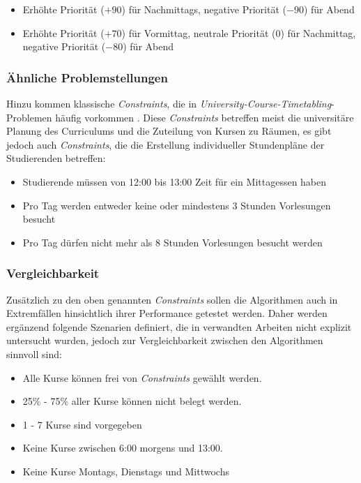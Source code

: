 \begin{itemize}
  \item Erhöhte Priorität ($+90$) für Nachmittags, negative Priorität ($-90$) für Abend
  \item Erhöhte Priorität ($+70$) für Vormittag, neutrale Priorität ($0$) für Nachmittag, negative Priorität ($-80$) für Abend
\end{itemize}





\subsubsection{Ähnliche Problemstellungen}

Hinzu kommen klassische \textit{Constraints}, die in \textit{University-Course-Timetabling}-Problemen häufig vorkommen \cite{chen-2021}. Diese \textit{Constraints} betreffen meist die universitäre Planung des Curriculums und die Zuteilung von Kursen zu Räumen, es gibt jedoch auch \textit{Constraints}, die die Erstellung individueller Stundenpläne der Studierenden betreffen:


\begin{itemize}
  \item Studierende müssen von 12:00 bis 13:00 Zeit für ein Mittagessen haben
  \item Pro Tag werden entweder keine oder mindestens 3 Stunden Vorlesungen besucht
  \item Pro Tag dürfen nicht mehr als 8 Stunden Vorlesungen besucht werden
\end{itemize}





\subsubsection{Vergleichbarkeit}

Zusätzlich zu den oben genannten \textit{Constraints} sollen die Algorithmen auch in Extremfällen hinsichtlich ihrer Performance getestet werden. Daher werden ergänzend folgende Szenarien definiert, die in verwandten Arbeiten nicht explizit untersucht wurden, jedoch zur Vergleichbarkeit zwischen den Algorithmen sinnvoll sind:


\begin{itemize}
  \item Alle Kurse können frei von \textit{Constraints} gewählt werden.
  \item 25\% - 75\% aller Kurse können nicht belegt werden.
  \item 1 - 7 Kurse sind vorgegeben
  \item Keine Kurse zwischen 6:00 morgens und 13:00.
  \item Keine Kurse Montags, Dienstags und Mittwochs
\end{itemize}